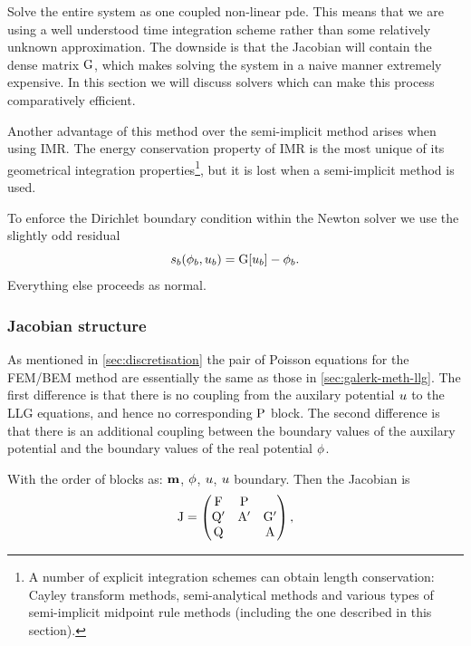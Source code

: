 Solve the entire system as one coupled non-linear pde.
This means that we are using a well understood time integration scheme rather than some relatively unknown approximation.
The downside is that the Jacobian will contain the dense matrix ${\mathbf{\mathrm{G}}}$, which makes solving the system in a naive manner extremely expensive.
In this section we will discuss solvers which can make this process comparatively efficient.

Another advantage of this method over the semi-implicit method arises when using IMR.
The energy conservation property of IMR is the most unique of its geometrical integration properties\footnote{A number of explicit integration schemes can obtain length conservation: Cayley transform methods\cite{Lewis2003}, semi-analytical methods\cite{Wiele2010} and various types of semi-implicit midpoint rule methods\cite{Spargo2003a}\cite{Mentink2010} (including the one described in this section).}, but it is lost when a semi-implicit method is used.

To enforce the Dirichlet boundary condition within the Newton solver we use the slightly odd residual
\newcommand{\rphimb}{\rphi_b}
\begin{equation}
  \rphimb(\phim_b, \phione_b) = \bm[\phione_b] - \phim_b.
\end{equation}
Everything else proceeds as normal.


\subsubsection{Jacobian structure}
\label{sec:bem-jacobian-structure}

As mentioned in \autoref{sec:discretisation} the pair of Poisson equations for the FEM/BEM method are essentially the same as those in \autoref{sec:galerk-meth-llg}.
The first difference is that there is no coupling from the auxilary potential $u$ to the LLG equations, and hence no corresponding $\mathrm{P}$ block.
The second difference is that there is an additional coupling between the boundary values of the auxilary potential and the boundary values of the real potential $\phi$.

With the order of blocks as: $\mathbf{m}$, $\phi$, $u$, $u$ boundary.
Then the Jacobian is
\begin{equation}
  \mathrm{J} = 
  \begin{pmatrix}
    \mathrm{F}       & \mathrm{P}     &  \\
    \mathrm{Q}'      & \mathrm{A}' &  {\mathbf{\mathrm{G}}}'  \\
    \mathrm{Q}       &         &   \mathrm{A}
  \end{pmatrix},
\end{equation}


